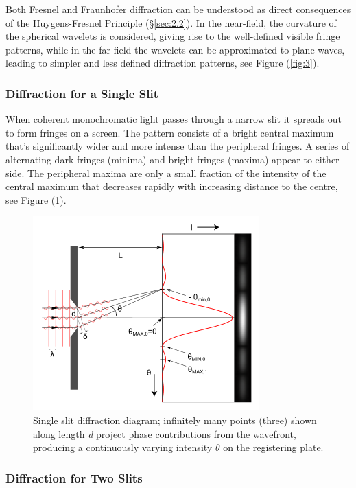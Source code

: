 \documentclass[12pt]{article}
\begin{document}
Both Fresnel and Fraunhofer diffraction can be understood as direct consequences of the Huygens-Fresnel Principle (§\ref{sec:2.2}). In the near-field, the curvature of the spherical wavelets is considered, giving rise
to the well-defined visible fringe patterns, while in the far-field the wavelets can be approximated to plane waves, leading to simpler and less defined diffraction patterns, see Figure (\ref{fig:3}). \cite{hecht2012optics}

\subsubsection{Diffraction for a Single Slit}

When coherent monochromatic light passes through a narrow slit it spreads out to form fringes on a screen. The pattern consists of a bright central maximum that's significantly wider and more intense
than the peripheral fringes. A series of alternating dark fringes (minima) and bright fringes (maxima) appear to either side. The peripheral maxima are only a small fraction of the intensity of the central maximum
that decreases rapidly with increasing distance to the centre, see Figure (\ref{fig:4}). \cite{hecht2012optics,Born_Wolf_Bhatia_Clemmow_Gabor_Stokes_Taylor_Wayman_Wilcock_1999,openstax3}

\begin{figure}[H]
    \centering
    \includegraphics[width=.5\textwidth]{Single_Slit_Diffraction.png}
    \caption{Single slit diffraction diagram; infinitely many points (three) shown along length \textit{d} project phase contributions from the wavefront, producing a continuously varying intensity \( \theta \) on the registering plate. \cite{enwiki:1313573322}}
    \label{fig:4}
\end{figure}

\subsubsection{Diffraction for Two Slits}
\end{document}
